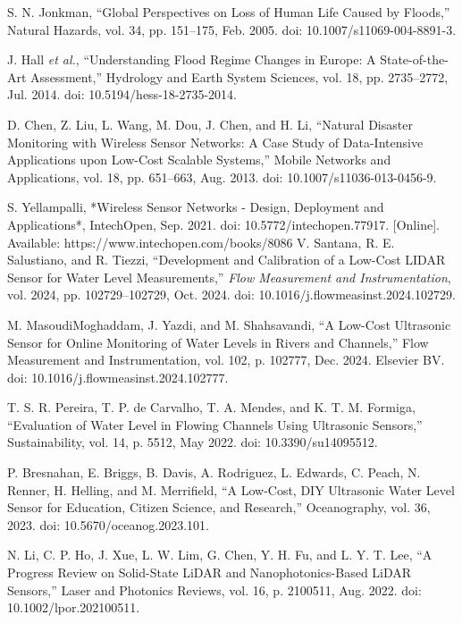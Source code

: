 \documentclass[conference]{IEEEtran}
\begin{document}
\begin{thebibliography}{00}
 S. N. Jonkman, 
``Global Perspectives on Loss of Human Life Caused by Floods,'' 
Natural Hazards, vol. 34, pp. 151--175, Feb. 2005. doi: 10.1007/s11069-004-8891-3.

 J. Hall \textit{et al.}, 
``Understanding Flood Regime Changes in Europe: A State-of-the-Art Assessment,'' 
Hydrology and Earth System Sciences, vol. 18, pp. 2735--2772, Jul. 2014. doi: 10.5194/hess-18-2735-2014.

 D. Chen, Z. Liu, L. Wang, M. Dou, J. Chen, and H. Li, 
``Natural Disaster Monitoring with Wireless Sensor Networks: A Case Study of Data-Intensive Applications upon Low-Cost Scalable Systems,'' 
Mobile Networks and Applications, vol. 18, pp. 651--663, Aug. 2013. doi: 10.1007/s11036-013-0456-9.

 S. Yellampalli, 
*Wireless Sensor Networks - Design, Deployment and Applications*, IntechOpen, Sep. 2021. doi: 10.5772/intechopen.77917. [Online]. Available: https://www.intechopen.com/books/8086
 V. Santana, R. E. Salustiano, and R. Tiezzi, ``Development and Calibration of a Low-Cost LIDAR Sensor for Water Level Measurements,'' \emph{Flow Measurement and Instrumentation}, vol. 2024, pp. 102729--102729, Oct. 2024. doi: 10.1016/j.flowmeasinst.2024.102729.

 M. MasoudiMoghaddam, J. Yazdi, and M. Shahsavandi, 
``A Low-Cost Ultrasonic Sensor for Online Monitoring of Water Levels in Rivers and Channels,'' 
Flow Measurement and Instrumentation, vol. 102, p. 102777, Dec. 2024. Elsevier BV. doi: 10.1016/j.flowmeasinst.2024.102777.

 T. S. R. Pereira, T. P. de Carvalho, T. A. Mendes, and K. T. M. Formiga, 
``Evaluation of Water Level in Flowing Channels Using Ultrasonic Sensors,'' 
Sustainability, vol. 14, p. 5512, May 2022. doi: 10.3390/su14095512.

 P. Bresnahan, E. Briggs, B. Davis, A. Rodriguez, L. Edwards, C. Peach, N. Renner, H. Helling, and M. Merrifield, 
``A Low-Cost, DIY Ultrasonic Water Level Sensor for Education, Citizen Science, and Research,'' 
Oceanography, vol. 36, 2023. doi: 10.5670/oceanog.2023.101.

 N. Li, C. P. Ho, J. Xue, L. W. Lim, G. Chen, Y. H. Fu, and L. Y. T. Lee, 
``A Progress Review on Solid-State LiDAR and Nanophotonics-Based LiDAR Sensors,'' 
Laser and Photonics Reviews, vol. 16, p. 2100511, Aug. 2022. doi: 10.1002/lpor.202100511.


\end{thebibliography}
\end{document}
